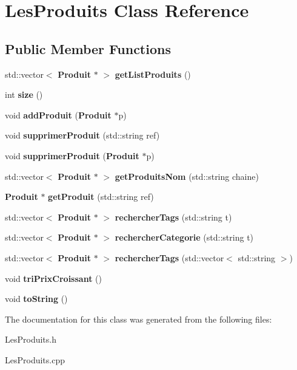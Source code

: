 \section{Les\-Produits Class Reference}
\label{class_les_produits}
\subsection*{Public Member Functions}
\begin{DoxyCompactItemize}
\item 
std\-::vector$<$ {\bf Produit} $\ast$ $>$ {\bfseries get\-List\-Produits} ()\label{class_les_produits_a0661c759a71e21ed568a9be3dc94a113}

\item 
int {\bfseries size} ()\label{class_les_produits_a471eb88643711b1c31c9c7fa1f2e4457}

\item 
void {\bfseries add\-Produit} ({\bf Produit} $\ast$p)\label{class_les_produits_a3ea4175a854859e98f357f843fe68813}

\item 
void {\bfseries supprimer\-Produit} (std\-::string ref)\label{class_les_produits_a09ff9e0b52cb6a62228a7a7f6fc04a37}

\item 
void {\bfseries supprimer\-Produit} ({\bf Produit} $\ast$p)\label{class_les_produits_acb7607cf2d8e004ed0018db6b56ebc3f}

\item 
std\-::vector$<$ {\bf Produit} $\ast$ $>$ {\bfseries get\-Produits\-Nom} (std\-::string chaine)\label{class_les_produits_aae4aa0a260d282dd98a7f6beef1cebef}

\item 
{\bf Produit} $\ast$ {\bfseries get\-Produit} (std\-::string ref)\label{class_les_produits_a4ed0454dafdbb5ee28424bdc0bbff1de}

\item 
std\-::vector$<$ {\bf Produit} $\ast$ $>$ {\bfseries rechercher\-Tags} (std\-::string t)\label{class_les_produits_aa3e835fe433b7c350c92c4f20e4162c0}

\item 
std\-::vector$<$ {\bf Produit} $\ast$ $>$ {\bfseries rechercher\-Categorie} (std\-::string t)\label{class_les_produits_a86a0c66d67118ec32e9b34475dd42def}

\item 
std\-::vector$<$ {\bf Produit} $\ast$ $>$ {\bfseries rechercher\-Tags} (std\-::vector$<$ std\-::string $>$)\label{class_les_produits_a6b48c5f164b34c4d1307cb897c62bbed}

\item 
void {\bfseries tri\-Prix\-Croissant} ()\label{class_les_produits_a38b67c16684b150fb1b933fa025c0a09}

\item 
void {\bfseries to\-String} ()\label{class_les_produits_ab34a7b3828242179821321f34e51a70f}

\end{DoxyCompactItemize}


The documentation for this class was generated from the following files\-:\begin{DoxyCompactItemize}
\item 
Les\-Produits.\-h\item 
Les\-Produits.\-cpp\end{DoxyCompactItemize}
